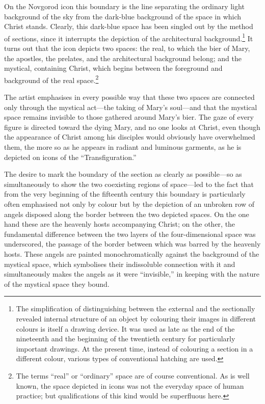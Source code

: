 On the Novgorod icon this boundary is the line separating the ordinary light background
of the sky from the dark-blue background of the space in which Christ stands.  Clearly,
this dark-blue space has been singled out by the method of sections, since it interrupts
the depiction of the architectural background.\footnote{The simplification of
  distinguishing between the external and the sectionally revealed internal structure of
  an object by colouring their images in different colours is itself a drawing device.
  It was used as late as the end of the nineteenth and the beginning of the twentieth
  century for particularly important drawings.  At the present time, instead of colouring
  a section in a different colour, various types of conventional hatching are used.}  It
turns out that the icon depicts two spaces: the real, to which the bier of Mary, the
apostles, the prelates, and the architectural background belong; and the mystical,
containing Christ, which begins between the foreground and background of the real
space.\footnote{The terms ``real'' or ``ordinary'' space are of course conventional.
  As is well known, the space depicted in icons was not the everyday space of human
  practice; but qualifications of this kind would be superfluous here.}



The artist emphasises in every possible way that these two spaces are connected only
through the mystical act---the taking of Mary's soul---and that the mystical space remains
invisible to those gathered around Mary's bier.  The gaze of every figure is directed
toward the dying Mary, and no one looks at Christ, even though the appearance of Christ
among his disciples would obviously have overwhelmed them, the more so as he appears in
radiant and luminous garments, as he is depicted on icons of the ``Transfiguration.''

The desire to mark the boundary of the section as clearly as possible---so as
simultaneously to show the two coexisting regions of space---led to the fact that from
the very beginning of the fifteenth century this boundary is particularly often emphasised
not only by colour but by the depiction of an unbroken row of angels disposed along the
border between the two depicted spaces.  On the one hand these are the heavenly hosts
accompanying Christ; on the other, the fundamental difference between the two layers of
the four-dimensional space was underscored, the passage of the border between which was
barred by the heavenly hosts.  These angels are painted monochromatically against the
background of the mystical space, which symbolises their indissoluble connection with it
and simultaneously makes the angels as it were ``invisible,'' in keeping with the nature
of the mystical space they bound.

